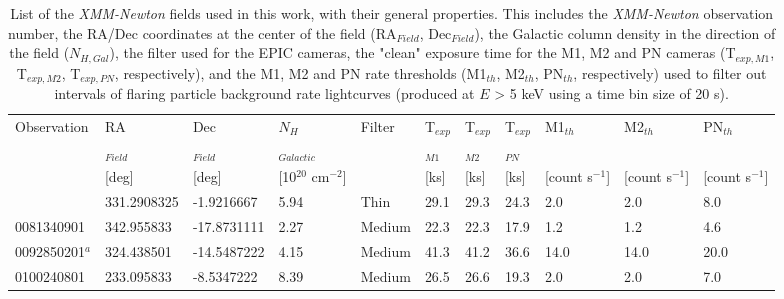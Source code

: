 \documentclass[fleqn,usenatbib]{mnras}
\begin{document}
    \begin{table*}
    \caption{List of the \textit{XMM-Newton} fields used in this work, with their general properties. This includes the \textit{XMM-Newton} observation number, the RA/Dec coordinates at the center of the field (RA$_{Field}$, Dec$_{Field}$), the Galactic column density in the direction of the field ($N_{H,Gal}$), the filter used for the EPIC cameras, the "clean" exposure time for the M1, M2 and PN cameras (T$_{exp, M1}$, T$_{exp, M2}$, T$_{exp, PN}$, respectively), and the M1, M2 and PN rate thresholds (M1$_{th}$, M2$_{th}$, PN$_{th}$, respectively) used to filter out intervals of flaring particle background rate lightcurves (produced at $E$ > 5 keV using a time bin size of 20 s).}
    \centering
    \setlength{\extrarowheight}{5pt}
    \begin{tabular}{lllllllllll}
        \hline
                       Observation &           RA &          Dec &               $N_{H}$\protect\footnotemark &    Filter & T$_{exp}$ & T$_{exp}$ &  T$_{exp}$ &          M1$_{th}$ &        M2$_{th}$ &        PN$_{th}$ \\
                                   &   $_{Field}$ &   $_{Field}$ &         $_{Galactic}$ &           &   $_{M1}$ &    $_{M2}$ &     $_{PN}$ &                  &                  &                  \\
                                   &        [deg] &        [deg] & [10$^{20}$ cm$^{-2}$] &           &      [ks] &       [ks] &        [ks] & [count s$^{-1}$] & [count s$^{-1}$] & [count s$^{-1}$] \\
        \addlinespace[4pt]
        \hline               
                        0012440301 &  331.2908325 &   -1.9216667 &                  5.94 &      Thin &      29.1 &       29.3 &        24.3 &              2.0 &              2.0 &              8.0 \\
                        0081340901 &   342.955833 &  -17.8731111 &                  2.27 &    Medium &      22.3 &       22.3 &        17.9 &              1.2 &              1.2 &              4.6 \\
                    0092850201$^a$ &   324.438501 &  -14.5487222 &                  4.15 &    Medium &      41.3 &       41.2 &        36.6 &             14.0 &             14.0 &             20.0 \\
                        0100240801 &   233.095833 &   -8.5347222 &                  8.39 &    Medium &      26.5 &       26.6 &        19.3 &              2.0 &              2.0 &              7.0 \\

\end{tabular}
\end{table*}
\end{document}
